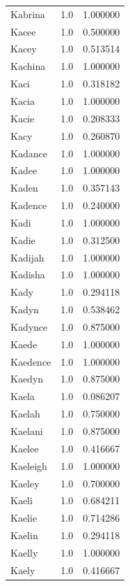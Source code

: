 \documentclass[
  letterpaper,
  DIV=11,
  numbers=noendperiod]{scrreprt}
\begin{document}
\begin{tabular}{lrr}
Kabrina         &   1.0 &   1.000000 \\
Kacee           &   1.0 &   0.500000 \\
Kacey           &   1.0 &   0.513514 \\
Kachina         &   1.0 &   1.000000 \\
Kaci            &   1.0 &   0.318182 \\
Kacia           &   1.0 &   1.000000 \\
Kacie           &   1.0 &   0.208333 \\
Kacy            &   1.0 &   0.260870 \\
Kadance         &   1.0 &   1.000000 \\
Kadee           &   1.0 &   1.000000 \\
Kaden           &   1.0 &   0.357143 \\
Kadence         &   1.0 &   0.240000 \\
Kadi            &   1.0 &   1.000000 \\
Kadie           &   1.0 &   0.312500 \\
Kadijah         &   1.0 &   1.000000 \\
Kadisha         &   1.0 &   1.000000 \\
Kady            &   1.0 &   0.294118 \\
Kadyn           &   1.0 &   0.538462 \\
Kadynce         &   1.0 &   0.875000 \\
Kaede           &   1.0 &   1.000000 \\
Kaedence        &   1.0 &   1.000000 \\
Kaedyn          &   1.0 &   0.875000 \\
Kaela           &   1.0 &   0.086207 \\
Kaelah          &   1.0 &   0.750000 \\
Kaelani         &   1.0 &   0.875000 \\
Kaelee          &   1.0 &   0.416667 \\
Kaeleigh        &   1.0 &   1.000000 \\
Kaeley          &   1.0 &   0.700000 \\
Kaeli           &   1.0 &   0.684211 \\
Kaelie          &   1.0 &   0.714286 \\
Kaelin          &   1.0 &   0.294118 \\
Kaelly          &   1.0 &   1.000000 \\
Kaely           &   1.0 &   0.416667 \\

\end{tabular}
\end{document}
